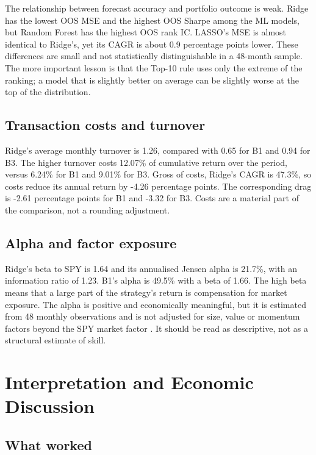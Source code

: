 \documentclass[11pt,a4paper]{article}
\begin{document}
The relationship between forecast accuracy and portfolio outcome is weak. Ridge has the lowest OOS MSE and the highest OOS Sharpe among the ML models, but Random Forest has the highest OOS rank IC. LASSO's MSE is almost identical to Ridge's, yet its CAGR is about 0.9 percentage points lower. These differences are small and not statistically distinguishable in a 48-month sample. The more important lesson is that the Top-10 rule uses only the extreme of the ranking; a model that is slightly better on average can be slightly worse at the top of the distribution.

\subsection{Transaction costs and turnover}

Ridge's average monthly turnover is 1.26, compared with 0.65 for B1 and 0.94 for B3. The higher turnover costs 12.07\% of cumulative return over the period, versus 6.24\% for B1 and 9.01\% for B3. Gross of costs, Ridge's CAGR is 47.3\%, so costs reduce its annual return by -4.26 percentage points. The corresponding drag is -2.61 percentage points for B1 and -3.32 for B3. Costs are a material part of the comparison, not a rounding adjustment.

\subsection{Alpha and factor exposure}

Ridge's beta to SPY is 1.64 and its annualised Jensen alpha is 21.7\%, with an information ratio of 1.23. B1's alpha is 49.5\% with a beta of 1.66. The high beta means that a large part of the strategy's return is compensation for market exposure. The alpha is positive and economically meaningful, but it is estimated from 48 monthly observations and is not adjusted for size, value or momentum factors beyond the SPY market factor \citep{fama1993, carhart1997}. It should be read as descriptive, not as a structural estimate of skill.


\section{Interpretation and Economic Discussion}
\label{sec:interpretation}

\subsection{What worked}
\end{document}
